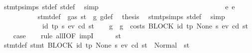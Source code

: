 \begin{isabellebody}
\ stmt{\isachardot}{\kern0pt}psimps{\isacharparenleft}{\kern0pt}{}{\isacharparenright}{\kern0pt}\ st{\isacharprime}{\kern0pt}{\isacharunderscore}{\kern0pt}def\ st{\isacharprime}{\kern0pt}{\isacharprime}{\kern0pt}{\isacharunderscore}{\kern0pt}def\ \isamarkupfalse%
\ simp\isanewline
\ \ \ \ \ \ \ \ \ \ \isamarkupfalse%
\isanewline
\ \ \ \ \ \ \ \ \isamarkupfalse%
\isanewline
\ \ \ \ \ \ \isamarkupfalse%
\isanewline
\ \ \ \ \ \ \ \ \isamarkupfalse%
\ {\isacharparenleft}{\kern0pt}e\ e{\isacharparenright}{\kern0pt}\isanewline
\ \ \ \ \ \ \ \ \isamarkupfalse%
\ {}{\isacharparenleft}{\kern0pt}{}{\isacharparenright}{\kern0pt}\ stmt{\isacharunderscore}{\kern0pt}def\ {\isacharbackquoteopen}{\isasymnot}\ gas\ st\ {\isasymle}\ g{\isacharbackquoteclose}\ g{\isacharunderscore}{\kern0pt}def\ \isamarkupfalse%
\ {\isacharquery}{\kern0pt}thesis\ \isamarkupfalse%
\ stmt{\isachardot}{\kern0pt}psimps{\isacharparenleft}{\kern0pt}{}{\isacharparenright}{\kern0pt}\ st{\isacharprime}{\kern0pt}{\isacharunderscore}{\kern0pt}def\ \isamarkupfalse%
\ simp\isanewline
\ \ \ \ \ \ \isamarkupfalse%
\isanewline
\ \ \ \ \isamarkupfalse%
\isanewline
\ \ \isamarkupfalse%
\isanewline
{}\isamarkupfalse%
\isanewline
\ \ \isamarkupfalse%
\ {\isacharparenleft}{\kern0pt}{}\ id{}\ tp\ s\ e\isactrlsub v\ cd\ st{\isacharparenright}{\kern0pt}\isanewline
\ \ \isamarkupfalse%
\ g\ \ {\isachardoublequoteopen}g\ {\isacharequal}{\kern0pt}\ costs\ {\isacharparenleft}{\kern0pt}BLOCK\ {\isacharparenleft}{\kern0pt}{\isacharparenleft}{\kern0pt}id{}{\isacharcomma}{\kern0pt}\ tp{\isacharparenright}{\kern0pt}{\isacharcomma}{\kern0pt}\ None{\isacharparenright}{\kern0pt}\ s{\isacharparenright}{\kern0pt}\ e\isactrlsub v\ cd\ st{\isachardoublequoteclose}\isanewline
\ \ \isamarkupfalse%
\ {\isacharquery}{\kern0pt}case\isanewline
\ \ \isamarkupfalse%
\ {\isacharparenleft}{\kern0pt}rule\ allI{\isacharbrackleft}{\kern0pt}OF\ impI{\isacharbrackright}{\kern0pt}{\isacharparenright}{\kern0pt}\isanewline
\ \ \ \ \isamarkupfalse%
\ st{}{\isacharprime}{\kern0pt}\ \isamarkupfalse%
\ stmt{\isacharunderscore}{\kern0pt}def{\isacharcolon}{\kern0pt}\ {\isachardoublequoteopen}stmt\ {\isacharparenleft}{\kern0pt}BLOCK\ {\isacharparenleft}{\kern0pt}{\isacharparenleft}{\kern0pt}id{}{\isacharcomma}{\kern0pt}\ tp{\isacharparenright}{\kern0pt}{\isacharcomma}{\kern0pt}\ None{\isacharparenright}{\kern0pt}\ s{\isacharparenright}{\kern0pt}\ e\isactrlsub v\ cd\ st\ {\isacharequal}{\kern0pt}\ Normal\ {\isacharparenleft}{\kern0pt}{\isacharparenleft}{\kern0pt}{\isacharparenright}{\kern0pt}{\isacharcomma}{\kern0pt}\ st{}{\isacharprime}{\kern0pt}{\isacharparenright}{\kern0pt}{\isachardoublequoteclose}\isanewline

\end{isabellebody}

